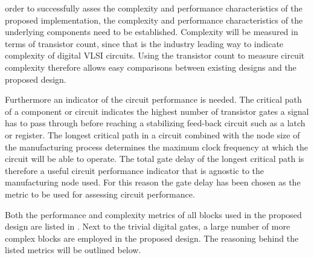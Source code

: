  order to successfully asses the complexity and performance characteristics of the proposed implementation, the complexity and performance characteristics of the underlying components need to be established. Complexity will be measured in terms of transistor count, since that is the industry leading way to indicate complexity of digital \ac{VLSI} circuits. Using the transistor count to measure circuit complexity therefore allows easy comparisons between existing designs and the proposed design.

Furthermore an indicator of the circuit performance is needed. The critical path of a component or circuit indicates the highest number of transistor gates a signal has to pass through before reaching a stabilizing feed-back circuit such as a latch or register. The longest critical path in a circuit combined with the node size\cite{STILLMAKER201774} of the manufacturing process determines the maximum clock frequency at which the circuit will be able to operate. The total gate delay of the longest critical path is therefore a useful circuit performance indicator that is agnostic to the manufacturing node used. For this reason the gate delay has been chosen as the metric to be used for assessing circuit performance.

Both the performance and complexity metrics of all blocks used in the proposed design are listed in . Next to the trivial digital gates, a large number of more complex blocks are employed in the proposed design. The reasoning behind the listed metrics will be outlined below.

